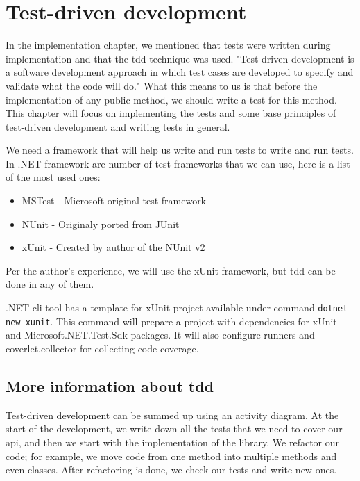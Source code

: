 \chapter {Test-driven development}

In the implementation chapter, we mentioned that tests were written during implementation and that the \acrshort{tdd} technique was used.
"Test-driven development is a software development approach in which test cases are developed to specify and validate what the code will do." \cite{hamilton_what_2020}
What this means to us is that before the implementation of any public method, we should write a test for this method.
This chapter will focus on implementing the tests and some base principles of test-driven development and writing tests in general.

We need a framework that will help us write and run tests to write and run tests.
In .NET framework are number of test frameworks that we can use, here is a list of the most used ones:

\begin{itemize}
    \item {MSTest - Microsoft original test framework}
    \item {NUnit - Originaly ported from JUnit \cite{poole_nunitorg_nodate}}
    \item {xUnit - Created by author of the NUnit v2 \cite{net_foundation_home_nodate}}
\end{itemize}

Per the author's experience, we will use the xUnit framework, but \acrshort{tdd} can be done in any of them.

.NET \acrshort{cli} tool has a template for xUnit project available under command \texttt{dotnet new xunit}. This command will
prepare a project with dependencies for xUnit and Microsoft.NET.Test.Sdk packages. It will also configure runners and coverlet.collector for collecting
code coverage.

\section{More information about \acrshort{tdd}}

Test-driven development can be summed up using an activity diagram.
At the start of the development, we write down all the tests that we need to cover our \acrshort{api}, and then we start with the implementation of the library.
We refactor our code; for example, we move code from one method into multiple methods and even classes.
After refactoring is done, we check our tests and write new ones.

